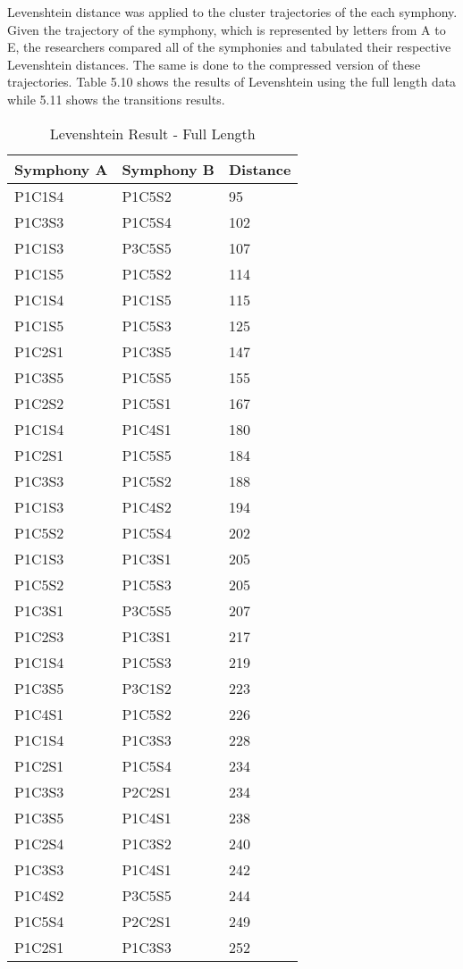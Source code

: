 Levenshtein distance was applied to the cluster trajectories of the each symphony. Given the trajectory of the symphony, which is represented by letters from A to E, the researchers compared all of the symphonies and tabulated their respective Levenshtein distances. The same is done to the compressed version of these trajectories.  Table 5.10 shows the results of Levenshtein using the full length data while 5.11 shows the transitions results.

\begin{longtable}{|l|l|l|}
\caption{Levenshtein Result - Full Length}
\label{my-label}\\
\hline
Symphony A & Symphony B & Distance \\ \hline
\endfirsthead
%
\endhead
%
P1C1S4 & P1C5S2 & 95 \\ \hline
P1C3S3 & P1C5S4 & 102 \\ \hline
P1C1S3 & P3C5S5 & 107 \\ \hline
P1C1S5 & P1C5S2 & 114 \\ \hline
P1C1S4 & P1C1S5 & 115 \\ \hline
P1C1S5 & P1C5S3 & 125 \\ \hline
P1C2S1 & P1C3S5 & 147 \\ \hline
P1C3S5 & P1C5S5 & 155 \\ \hline
P1C2S2 & P1C5S1 & 167 \\ \hline
P1C1S4 & P1C4S1 & 180 \\ \hline
P1C2S1 & P1C5S5 & 184 \\ \hline
P1C3S3 & P1C5S2 & 188 \\ \hline
P1C1S3 & P1C4S2 & 194 \\ \hline
P1C5S2 & P1C5S4 & 202 \\ \hline
P1C1S3 & P1C3S1 & 205 \\ \hline
P1C5S2 & P1C5S3 & 205 \\ \hline
P1C3S1 & P3C5S5 & 207 \\ \hline
P1C2S3 & P1C3S1 & 217 \\ \hline
P1C1S4 & P1C5S3 & 219 \\ \hline
P1C3S5 & P3C1S2 & 223 \\ \hline
P1C4S1 & P1C5S2 & 226 \\ \hline
P1C1S4 & P1C3S3 & 228 \\ \hline
P1C2S1 & P1C5S4 & 234 \\ \hline
P1C3S3 & P2C2S1 & 234 \\ \hline
P1C3S5 & P1C4S1 & 238 \\ \hline
P1C2S4 & P1C3S2 & 240 \\ \hline
P1C3S3 & P1C4S1 & 242 \\ \hline
P1C4S2 & P3C5S5 & 244 \\ \hline
P1C5S4 & P2C2S1 & 249 \\ \hline
P1C2S1 & P1C3S3 & 252 \\ \hline
\end{longtable}


